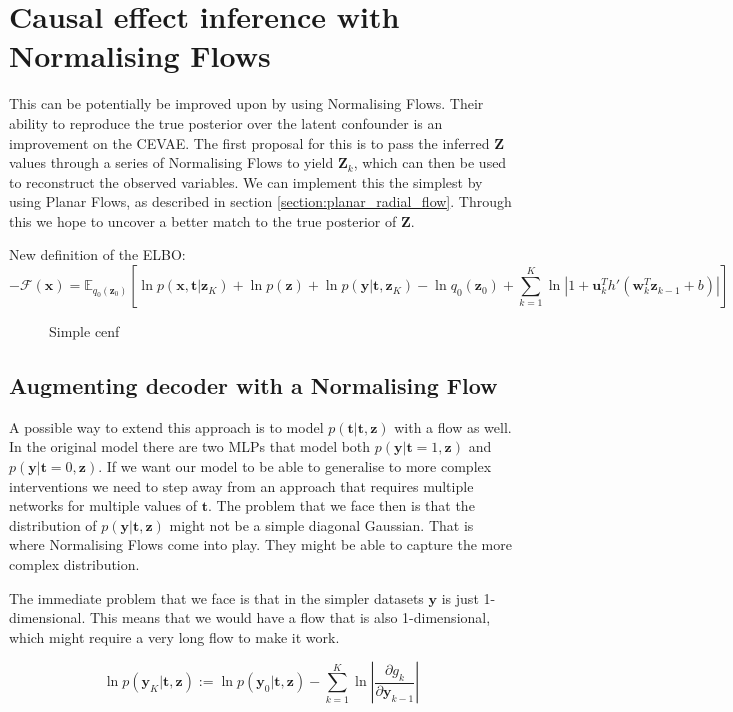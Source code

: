 \documentclass{report}
\newcommand{\bt}{\mathbf{t}}
\newcommand{\bu}{\mathbf{u}}
\newcommand{\bw}{\mathbf{w}}
\newcommand{\bx}{\mathbf{x}}
\newcommand{\by}{\mathbf{y}}
\newcommand{\bZ}{\mathbf{Z}}
\newcommand{\bz}{\mathbf{z}}
\newcommand{\parfrac}[2]{\frac{\partial #1}{\partial#2}}
\begin{document}
\section{Causal effect inference with Normalising Flows}
This can be potentially be improved upon by using Normalising Flows. Their ability to reproduce the true posterior over the latent confounder is an improvement on the CEVAE. The first proposal for this is to pass the inferred $\bZ$ values through a series of Normalising Flows to yield $\bZ_k$, which can then be used to reconstruct the observed variables. We can implement this the simplest by using Planar Flows, as described in section \ref{section:planar_radial_flow}. Through this we hope to uncover a better match to the true posterior of $\bZ$.

\noindent
New definition of the ELBO:
\begin{equation}
    -\mathcal{F}(\bx) = \mathbb{E}_{q_0(\bz_0)}\left[\ln p(\bx, \bt | \bz_K) + \ln p(\bz) + \ln p(\by |\bt, \bz_K) - \ln q_0(\bz_0) + \sum\limits^K_{k=1} \ln \left| 1 + \bu_k^Th'(\bw^T_k\bz_{k-1} + b)\right| \right]
\end{equation}


\begin{figure}
    \centering
    
    \caption{Simple cenf}
    \label{fig:cenf_with_vae}
\end{figure}

\subsection{Augmenting decoder with a Normalising Flow}
A possible way to extend this approach is to model $p(\bt|\bt,\bz)$ with a flow as well. In the original model there are two MLPs that model both $p(\by|\bt=1,\bz)$ and $p(\by|\bt=0,\bz)$. If we want our model to be able to generalise to more complex interventions we need to step away from an approach that requires multiple networks for multiple values of $\bt$. The problem that we face then is that the distribution of $p(\by|\bt,\bz)$ might not be a simple diagonal Gaussian. That is where Normalising Flows come into play. They might be able to capture the more complex distribution. 

The immediate problem that we face is that in the simpler datasets $\by$ is just 1-dimensional. This means that we would have a flow that is also 1-dimensional, which might require a very long flow to make it work.

\begin{equation}
    \ln p(\by_K|\bt, \bz) := \ln p(\by_0|\bt, \bz) - \sum\limits^K_{k=1} \ln \left | \parfrac{g_k}{\by_{k-1}} \right|
\end{equation}



\end{document}

